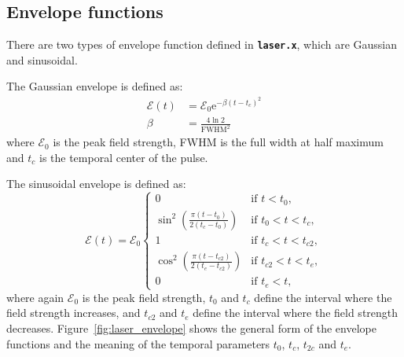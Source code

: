 \documentclass[a4paper,10pt,DIV=15,openany]{scrbook}
\newcommand{\ttt}[1]{\textbf{\texttt{#1}}}
\newcommand{\E}{\ensuremath{\mathrm{e}}}
\begin{document}
\subsection{Envelope functions}

There are two types of envelope function defined in \ttt{laser.x}, which are Gaussian and sinusoidal.

The Gaussian envelope is defined as:
\begin{align}
  \mathcal{E}(t)&=\mathcal{E}_0 \E^{-\beta(t-t_c)^2}\label{eq:laser_gauss_1}\\
  \beta&=\frac{4\ln 2}{\mathrm{FWHM}^2}\label{eq:laser_gauss_2}
\end{align}
where $\mathcal{E}_0$ is the peak field strength, FWHM is the full width at half maximum and $t_c$ is the temporal center of the pulse.

The sinusoidal envelope is defined as:
\begin{equation}
  \mathcal{E}(t)=\mathcal{E}_0
  \begin{cases}
    0                                                   &\text{if } t<t_0,\\
    \sin^2\left(\frac{\pi(t-t_0)}{2(t_c-t_0)}\right)      &\text{if } t_0<t<t_c,\\
    1                                                   &\text{if } t_c<t<t_{c2},\\
    \cos^2\left(\frac{\pi(t-t_{c2})}{2(t_e-t_{c2})}\right)      &\text{if } t_{c2}<t<t_e,\\
    0                                                   &\text{if } t_e<t,\label{eq:laser_sinus}
  \end{cases}
\end{equation}
where again $\mathcal{E}_0$ is the peak field strength, $t_0$ and $t_c$ define the interval where the field strength increases, and $t_{c2}$ and $t_e$ define the interval where the field strength decreases. Figure~\ref{fig:laser_envelope} shows the general form of the envelope functions and the meaning of the temporal parameters $t_0$, $t_c$, $t_{2c}$ and $t_e$.
\end{document}
